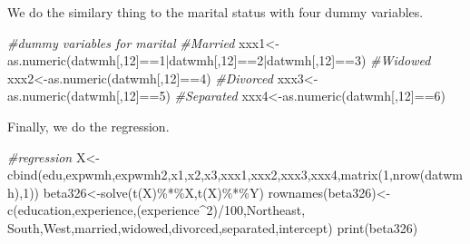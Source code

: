 \documentclass[
]{article}
\newenvironment{Shaded}{\begin{snugshade}}{\end{snugshade}}
\newcommand{\CommentTok}[1]{\textcolor[rgb]{0.56,0.35,0.01}{\textit{#1}}}
\newcommand{\DecValTok}[1]{\textcolor[rgb]{0.00,0.00,0.81}{#1}}
\newcommand{\FunctionTok}[1]{\textcolor[rgb]{0.00,0.00,0.00}{#1}}
\newcommand{\NormalTok}[1]{#1}
\newcommand{\OtherTok}[1]{\textcolor[rgb]{0.56,0.35,0.01}{#1}}
\newcommand{\SpecialCharTok}[1]{\textcolor[rgb]{0.00,0.00,0.00}{#1}}
\newcommand{\StringTok}[1]{\textcolor[rgb]{0.31,0.60,0.02}{#1}}
\begin{document}
We do the similary thing to the marital status with four dummy
variables.

\begin{Shaded}
\begin{Highlighting}[]
\CommentTok{\#dummy variables for marital}
\CommentTok{\#Married}
\NormalTok{xxx1}\OtherTok{\textless{}{-}}\FunctionTok{as.numeric}\NormalTok{(datwmh[,}\DecValTok{12}\NormalTok{]}\SpecialCharTok{==}\DecValTok{1}\SpecialCharTok{|}\NormalTok{datwmh[,}\DecValTok{12}\NormalTok{]}\SpecialCharTok{==}\DecValTok{2}\SpecialCharTok{|}\NormalTok{datwmh[,}\DecValTok{12}\NormalTok{]}\SpecialCharTok{==}\DecValTok{3}\NormalTok{)}
\CommentTok{\#Widowed}
\NormalTok{xxx2}\OtherTok{\textless{}{-}}\FunctionTok{as.numeric}\NormalTok{(datwmh[,}\DecValTok{12}\NormalTok{]}\SpecialCharTok{==}\DecValTok{4}\NormalTok{)}
\CommentTok{\#Divorced}
\NormalTok{xxx3}\OtherTok{\textless{}{-}}\FunctionTok{as.numeric}\NormalTok{(datwmh[,}\DecValTok{12}\NormalTok{]}\SpecialCharTok{==}\DecValTok{5}\NormalTok{)}
\CommentTok{\#Separated}
\NormalTok{xxx4}\OtherTok{\textless{}{-}}\FunctionTok{as.numeric}\NormalTok{(datwmh[,}\DecValTok{12}\NormalTok{]}\SpecialCharTok{==}\DecValTok{6}\NormalTok{)}
\end{Highlighting}
\end{Shaded}

Finally, we do the regression.

\begin{Shaded}
\begin{Highlighting}[]
\CommentTok{\#regression}
\NormalTok{X}\OtherTok{\textless{}{-}}\FunctionTok{cbind}\NormalTok{(edu,expwmh,expwmh2,x1,x2,x3,xxx1,xxx2,xxx3,xxx4,}\FunctionTok{matrix}\NormalTok{(}\DecValTok{1}\NormalTok{,}\FunctionTok{nrow}\NormalTok{(datwmh),}\DecValTok{1}\NormalTok{))}
\NormalTok{beta326}\OtherTok{\textless{}{-}}\FunctionTok{solve}\NormalTok{(}\FunctionTok{t}\NormalTok{(X)}\SpecialCharTok{\%*\%}\NormalTok{X,}\FunctionTok{t}\NormalTok{(X)}\SpecialCharTok{\%*\%}\NormalTok{Y)}
\FunctionTok{rownames}\NormalTok{(beta326)}\OtherTok{\textless{}{-}}\FunctionTok{c}\NormalTok{(}\StringTok{\textquotesingle{}education\textquotesingle{}}\NormalTok{,}\StringTok{\textquotesingle{}experience\textquotesingle{}}\NormalTok{,}\StringTok{\textquotesingle{}(experience\^{}2)/100\textquotesingle{}}\NormalTok{,}\StringTok{\textquotesingle{}Northeast\textquotesingle{}}\NormalTok{,}
\StringTok{\textquotesingle{}South\textquotesingle{}}\NormalTok{,}\StringTok{\textquotesingle{}West\textquotesingle{}}\NormalTok{,}\StringTok{\textquotesingle{}married\textquotesingle{}}\NormalTok{,}\StringTok{\textquotesingle{}widowed\textquotesingle{}}\NormalTok{,}\StringTok{\textquotesingle{}divorced\textquotesingle{}}\NormalTok{,}\StringTok{\textquotesingle{}separated\textquotesingle{}}\NormalTok{,}\StringTok{\textquotesingle{}intercept\textquotesingle{}}\NormalTok{)}
\FunctionTok{print}\NormalTok{(beta326)}
\end{Highlighting}
\end{Shaded}
\end{document}
